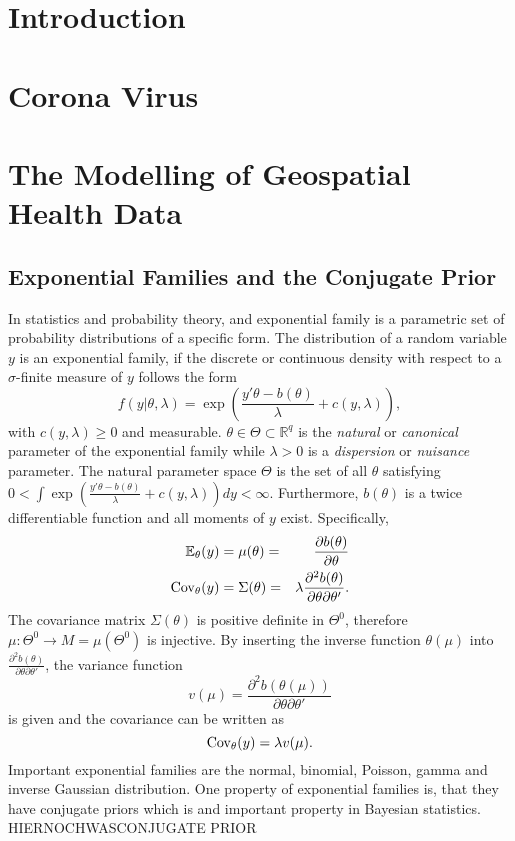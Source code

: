 \documentclass[12pt]{book}
\begin{document}
\chapter{Introduction}
\chapter{Corona Virus}
\chapter{The Modelling of Geospatial Health Data}
\section{Exponential Families and the Conjugate Prior}
In statistics and probability theory, and exponential family is a parametric set of probability distributions of a specific form. The distribution of a random variable $y$ is an exponential family, if the discrete or continuous density with respect to a $\sigma$-finite measure of $y$ follows the form
\begin{equation}
    f(y|\theta, \lambda)=\exp\left(\frac{y'\theta - b(\theta)}{\lambda}+c(y,\lambda) \right),
\end{equation}
with $c(y,\lambda)\geq 0$ and measurable. $\theta\in\Theta\subset\mathbb{R}^q$ is the \textit{natural} or \textit{canonical} parameter of the exponential family while $\lambda > 0$ is a \textit{dispersion} or \textit{nuisance} parameter. The natural parameter space $\Theta$ is the set of all $\theta$ satisfying $0<\int\exp\left(\frac{y'\theta - b(\theta)}{\lambda}+c(y,\lambda) \right)dy< \infty$. Furthermore, $b(\theta)$ is a twice differentiable function and all moments of $y$ exist. Specifically, 
\begin{alignat}{3}
    \mathbb{E}_\theta(y) &= \mu(\theta) =& \frac{\partial b(\theta)}{\partial\theta} \\
    \hbox{Cov}_\theta(y) &= \Sigma(\theta) =& \lambda\frac{\partial^2b(\theta)}{\partial\theta\partial\theta'}.
\end{alignat}
The covariance matrix $\Sigma(\theta)$ is positive definite in $\Theta^0$, therefore $\mu:\Theta^0\rightarrow  M = \mu\left(\Theta^0\right)$ is injective. By inserting the inverse function $\theta(\mu)$ into $\frac{\partial^2b(\theta)}{\partial\theta\partial\theta'}$, the variance function 
\begin{equation}
    v(\mu)=\frac{\partial^2b(\theta(\mu))}{\partial\theta\partial\theta'}
\end{equation}
is given and the covariance can be written as
\begin{equation}
    \hbox{Cov}_\theta(y) = \lambda v(\mu).
\end{equation}
Important exponential families are the normal, binomial, Poisson, gamma and inverse Gaussian distribution. \autocite[Cf.][]{fahrmeir2013multivariate} One property of exponential families is, that they have conjugate priors which is and important property in Bayesian statistics. HIERNOCHWASCONJUGATE PRIOR
\end{document}
